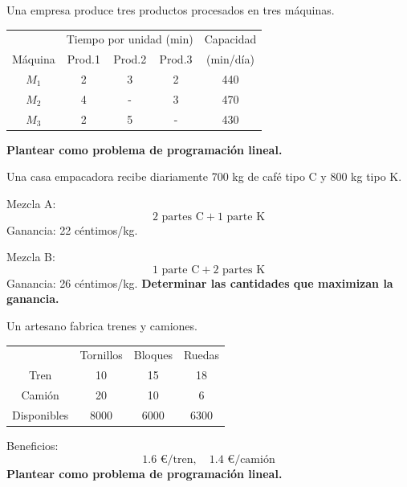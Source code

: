 \begin{Ejer}

Una empresa produce tres productos procesados en tres m\'aquinas.

\begin{center}
\begin{tabular}{c|ccc|c}

 & \multicolumn{3}{c|}{Tiempo por unidad (min)} & Capacidad \\
M\'aquina & Prod.1 & Prod.2 & Prod.3 & (min/d\'ia) \\

$M_1$ & 2 & 3 & 2 & 440 \\
$M_2$ & 4 & - & 3 & 470 \\
$M_3$ & 2 & 5 & - & 430 \\

\end{tabular}
\end{center}
\textbf{Plantear como problema de programaci\'on lineal.}
\end{Ejer}


\begin{Ejer}

Una casa empacadora recibe diariamente 700 kg de caf\'e tipo C y 800 kg tipo K.

Mezcla A:
\[
2 \text{ partes C} + 1 \text{ parte K}
\]
Ganancia: 22 c\'entimos/kg.

Mezcla B:
\[
1 \text{ parte C} + 2 \text{ partes K}
\]
Ganancia: 26 c\'entimos/kg. \textbf{Determinar las cantidades que maximizan la ganancia.}
\end{Ejer}

\begin{Ejer}

Un artesano fabrica trenes y camiones.

\begin{center}
\begin{tabular}{c|ccc}

 & Tornillos & Bloques & Ruedas \\

Tren & 10 & 15 & 18 \\
Cami\'on & 20 & 10 & 6 \\

Disponibles & 8000 & 6000 & 6300 \\

\end{tabular}
\end{center}

Beneficios:
\[
1.6 \text{ €/tren}, \quad 1.4 \text{ €/cami\'on}
\]
\textbf{Plantear como problema de programaci\'on lineal.}
\end{Ejer}

